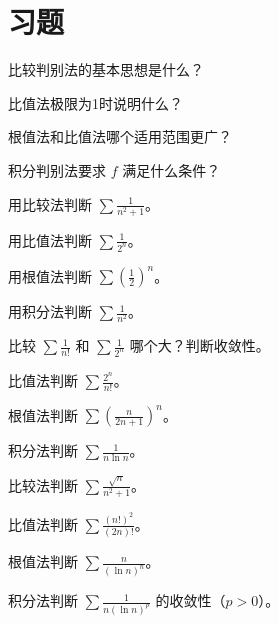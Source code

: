 \section{习题}
\begin{exercise}[0] 比较判别法的基本思想是什么？\end{exercise}
\begin{exercise}[0] 比值法极限为1时说明什么？\end{exercise}
\begin{exercise}[0] 根值法和比值法哪个适用范围更广？\end{exercise}
\begin{exercise}[0] 积分判别法要求 \(f\) 满足什么条件？\end{exercise}
\begin{exercise}[1] 用比较法判断 \(\sum\frac1{n^2+1}\)。\end{exercise}
\begin{exercise}[1] 用比值法判断 \(\sum\frac1{2^n}\)。\end{exercise}
\begin{exercise}[1] 用根值法判断 \(\sum(\frac12)^n\)。\end{exercise}
\begin{exercise}[1] 用积分法判断 \(\sum\frac1{n^2}\)。\end{exercise}
\begin{exercise}[2] 比较 \(\sum\frac1{n!}\) 和 \(\sum\frac1{2^n}\) 哪个大？判断收敛性。\end{exercise}
\begin{exercise}[2] 比值法判断 \(\sum\frac{2^n}{n!}\)。\end{exercise}
\begin{exercise}[2] 根值法判断 \(\sum(\frac{n}{2n+1})^n\)。\end{exercise}
\begin{exercise}[2] 积分法判断 \(\sum\frac1{n\ln n}\)。\end{exercise}
\begin{exercise}[3] 比较法判断 \(\sum\frac{\sqrt{n}}{n^2+1}\)。\end{exercise}
\begin{exercise}[3] 比值法判断 \(\sum\frac{(n!)^2}{(2n)!}\)。\end{exercise}
\begin{exercise}[3] 根值法判断 \(\sum\frac{n}{(\ln n)^n}\)。\end{exercise}
\begin{exercise}[3] 积分法判断 \(\sum\frac{1}{n(\ln n)^p}\) 的收敛性（\(p>0\)）。\end{exercise}
